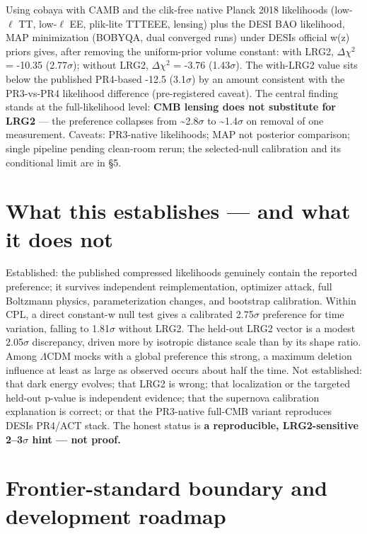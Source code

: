 \documentclass[aps,prd,preprint,superscriptaddress,nofootinbib]{revtex4-2}
\begin{document}
Using cobaya with CAMB and the clik-free native Planck 2018 likelihoods
(low-\(\ell\) TT, low-\(\ell\) EE, plik-lite TTTEEE, lensing) plus the
DESI BAO likelihood, MAP minimization (BOBYQA, dual converged runs)
under DESI\textquotesingle s official w(z) priors gives, after removing
the uniform-prior volume constant: with LRG2, \(\Delta\chi^2\) = -10.35
(2.77\(\sigma\)); without LRG2, \(\Delta\chi^2\) = -3.76
(1.43\(\sigma\)). The with-LRG2 value sits below the published PR4-based
-12.5 (3.1\(\sigma\)) by an amount consistent with the PR3-vs-PR4
likelihood difference (pre-registered caveat). The central finding
stands at the full-likelihood level: \textbf{CMB lensing does not
substitute for LRG2} --- the preference collapses from
\textasciitilde2.8\(\sigma\) to \textasciitilde1.4\(\sigma\) on removal
of one measurement. Caveats: PR3-native likelihoods; MAP not posterior
comparison; single pipeline pending clean-room rerun; the selected-null
calibration and its conditional limit are in §5.

\section{What this establishes --- and what it does
not}\label{what-this-establishes--and-what-it-does-not}

Established: the published compressed likelihoods genuinely contain the
reported preference; it survives independent reimplementation, optimizer
attack, full Boltzmann physics, parameterization changes, and bootstrap
calibration. Within CPL, a direct constant-w null test gives a
calibrated 2.75\(\sigma\) preference for time variation, falling to
1.81\(\sigma\) without LRG2. The held-out LRG2 vector is a modest
2.05\(\sigma\) discrepancy, driven more by isotropic distance scale than
by its shape ratio. Among \(\Lambda\)CDM mocks with a global preference
this strong, a maximum deletion influence at least as large as observed
occurs about half the time. Not established: that dark energy evolves;
that LRG2 is wrong; that localization or the targeted held-out p-value
is independent evidence; that the supernova calibration explanation is
correct; or that the PR3-native full-CMB variant reproduces
DESI\textquotesingle s PR4/ACT stack. The honest status is \textbf{a
reproducible, LRG2-sensitive 2--3\(\sigma\) hint --- not proof.}

\section{Frontier-standard boundary and development
roadmap}\label{frontier-standard-boundary-and-development-roadmap}
\end{document}
